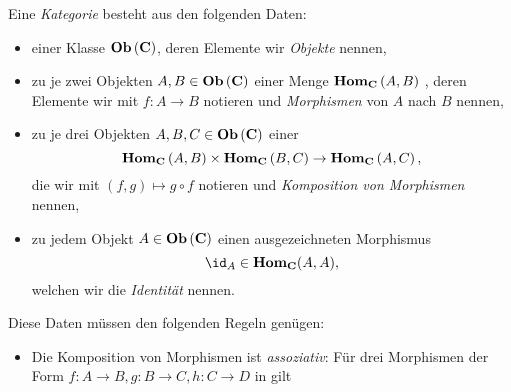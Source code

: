 \documentclass{article}
\begin{document}
		\begin{defi}[Kategorie]
		\cite[Definition 2.2.2]{Bra}
		Eine \emph{Kategorie} \CatC besteht aus den folgenden Daten:
		\begin{itemize}
			\item einer Klasse \(  \mathbf{Ob}  \left( \mathbf{C} \right) \), deren Elemente wir \emph{Objekte} nennen,
			\item zu je zwei Objekten 
			\begin{math}
				A,B \in  \mathbf{Ob}  \left( \mathbf{C}  \right) 
			\end{math}
			einer Menge 
			\begin{math}
				 \mathbf{Hom } _\mathbf{C} \left( A,B \right) 
			\end{math}
			, deren Elemente wir mit 
			\begin{math}
				f : A \to B 
			\end{math}
			notieren und \emph{Morphismen} von $ A $ nach $ B $ nennen,
			\item zu je drei Objekten 
			\begin{math}
		 A,B,C \in  \mathbf{Ob}  \left( \mathbf{C}  \right) 
			\end{math}	
			einer \Abb 
			\begin{displaymath}
				 \mathbf{Hom } _\mathbf{C} \left( A,B \right) \times  \mathbf{Hom } _\mathbf{C} \left( B,C \right) \to  \mathbf{Hom } _\mathbf{C} \left( A,C \right) ,
			\end{displaymath}
			die wir mit 
			\begin{math}
				\left( f,g \right) \mapsto g \circ f
			\end{math}
			notieren und \emph{Komposition von Morphismen} nennen, 
		\item zu jedem Objekt 
			\begin{math}
				A \in  \mathbf{Ob}  \left( \mathbf{C} \right)
			\end{math} 	
			einen ausgezeichneten Morphismus 
			\begin{displaymath}
				\id_A \in \Hom_\CatC ( A,A) ,
			\end{displaymath}
			welchen wir die \emph{Identit\"at} nennen.
		\end{itemize}
		Diese Daten m\"ussen den folgenden Regeln gen\"ugen:
		\begin{itemize}
			\item Die Komposition von Morphismen ist \emph{assoziativ}: F\"ur drei Morphismen der Form
			\begin{math}
				f: A \to B , g: B \to C, h:C \to D 
			\end{math}
			in \CatC gilt 
			\begin{displaymath}

\end{displaymath}
\end{itemize}
\end{defi}
\end{document}

